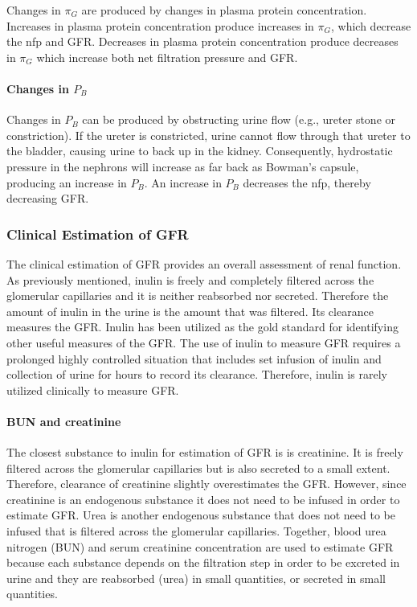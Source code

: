 Changes in $\pi_{G}$ are produced by changes in plasma protein concentration. Increases in plasma protein concentration produce increases in $\pi_{G}$, which decrease the nfp and GFR. Decreases in plasma protein concentration produce decreases in $\pi_{G}$ which increase both net filtration pressure and GFR.

\paragraph{Changes in $P_{B}$}

Changes in $P_{B}$ can be produced by obstructing urine flow (e.g., ureter stone or constriction). If the ureter is constricted, urine cannot flow through that ureter to the bladder, causing urine to back up in the kidney. Consequently, hydrostatic pressure in the nephrons will increase as far back as Bowman’s capsule, producing an increase in $P_{B}$. An increase in $P_{B}$ decreases the nfp, thereby decreasing GFR. 


\subsubsection{Clinical Estimation of GFR}

The clinical estimation of GFR provides an overall assessment of renal function. As previously mentioned, inulin is freely and completely filtered across the glomerular capillaries and it is neither reabsorbed nor secreted. Therefore the amount of inulin in the urine is the amount that was filtered. Its clearance measures the GFR. Inulin has been utilized as the gold standard for identifying other useful measures of the GFR. The use of inulin to measure GFR requires a prolonged highly controlled situation that includes set infusion of inulin and collection of urine for hours to record its clearance. Therefore, inulin is rarely utilized clinically to measure GFR.

\paragraph{BUN and creatinine}

The closest substance to inulin for estimation of GFR is is creatinine. It is freely filtered across the glomerular capillaries but is also secreted to a small extent. Therefore, clearance of creatinine slightly overestimates the GFR. However, since creatinine is an endogenous substance it does not need to be infused in order to estimate GFR. Urea is another endogenous substance that does not need to be infused that is filtered across the glomerular capillaries. Together, blood urea nitrogen (BUN) and serum creatinine concentration are used to estimate GFR because each substance depends on the filtration step in order to be excreted in urine and they are reabsorbed (urea) in small quantities, or secreted in small quantities. 

